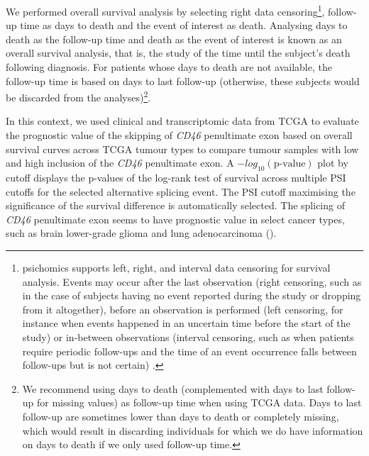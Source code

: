 We performed overall survival analysis by selecting right data censoring\footnote{psichomics supports left, right, and interval data censoring for survival analysis. Events may occur after the last observation (right censoring, such as in the case of subjects having no event reported during the study or dropping from it altogether), before an observation is performed (left censoring, for instance when events happened in an uncertain time before the start of the study) or in-between observations (interval censoring, such as when patients require periodic follow-ups and the time of an event occurrence falls between follow-ups but is not certain) \cite{zhang:2010wk}.}, follow-up time as days to death and the event of interest as death. Analysing days to death as the follow-up time and death as the event of interest is known as an overall survival analysis, that is, the study of the time until the subject’s death following diagnosis. For patients whose days to death are not available, the follow-up time is based on days to last follow-up (otherwise, these subjects would be discarded from the analyses)\footnote{We recommend using days to death (complemented with days to last follow-up for missing values) as follow-up time when using TCGA data. Days to last follow-up are sometimes lower than days to death or completely missing, which would result in discarding individuals for which we do have information on days to death if we only used follow-up time.}.
 
In this context, we used clinical and transcriptomic data from TCGA to evaluate the prognostic value of the skipping of \emph{CD46} penultimate exon based on overall survival curves across TCGA tumour types to compare tumour samples with low and high inclusion of the \emph{CD46} penultimate exon. A $-log_{10}(\textrm{p-value})$ plot by cutoff displays the p-values of the log-rank test of survival across multiple PSI cutoffs for the selected alternative splicing event. The PSI cutoff maximising the significance of the survival difference is automatically selected. The splicing of \emph{CD46} penultimate exon seems to have prognostic value in select cancer types, such as brain lower-grade glioma and lung adenocarcinoma ().


